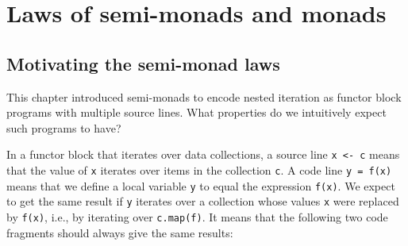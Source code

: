 \section{Laws of semi-monads and monads}

\subsection{Motivating the semi-monad laws}

This chapter introduced semi-monads to encode nested iteration as
functor block programs with multiple source lines. What properties
do we intuitively expect such programs to have?

In a functor block that iterates over data collections, a source line
\lstinline!x <- c! means that the value of \lstinline!x! iterates
over items in the collection \lstinline!c!. A code line \lstinline!y = f(x)!
means that we define a local variable \lstinline!y! to equal the
expression \lstinline!f(x)!. We expect to get the same result if
\lstinline!y! iterates over a collection whose values \lstinline!x!
were replaced by \lstinline!f(x)!, i.e., by iterating over \lstinline!c.map(f)!.
It means that the following two code fragments should always give
the same results:

\vspace{0.3\baselineskip}

